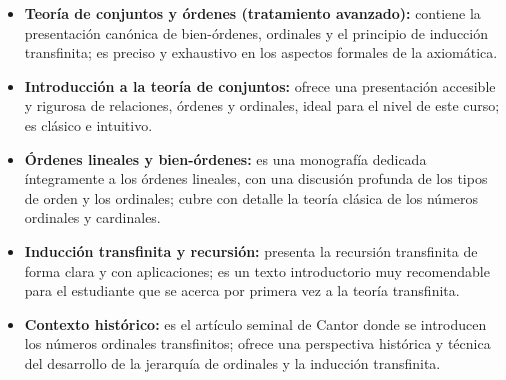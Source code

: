 \begin{itemize}[leftmargin=2em]
  \item \textbf{Teoría de conjuntos y órdenes (tratamiento avanzado):} \cite{jech2003} contiene la presentación canónica de bien-órdenes, ordinales y el principio de inducción transfinita; \cite{kunen2011} es preciso y exhaustivo en los aspectos formales de la axiomática.

  \item \textbf{Introducción a la teoría de conjuntos:} \cite{enderton1977} ofrece una presentación accesible y rigurosa de relaciones, órdenes y ordinales, ideal para el nivel de este curso; \cite{halmos1960} es clásico e intuitivo.

  \item \textbf{Órdenes lineales y bien-órdenes:} \cite{rosenstein1982} es una monografía dedicada íntegramente a los órdenes lineales, con una discusión profunda de los tipos de orden y los ordinales; \cite{sierpinski1958} cubre con detalle la teoría clásica de los números ordinales y cardinales.

  \item \textbf{Inducción transfinita y recursión:} \cite{devlin1993} presenta la recursión transfinita de forma clara y con aplicaciones; \cite{hrbacek1999} es un texto introductorio muy recomendable para el estudiante que se acerca por primera vez a la teoría transfinita.

  \item \textbf{Contexto histórico:} \cite{cantor1883} es el artículo seminal de Cantor donde se introducen los números ordinales transfinitos; \cite{kanamori2003} ofrece una perspectiva histórica y técnica del desarrollo de la jerarquía de ordinales y la inducción transfinita.
\end{itemize}
